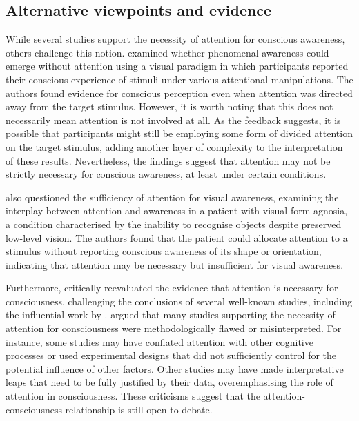 \documentclass[10pt]{article}
\begin{document}
\begin{sloppypar}
  \subsection{Alternative viewpoints and evidence}
  \label{sec:alternative}

  While several studies support the necessity of attention for conscious awareness, others challenge this notion. \cite{aru_phenomenal_2013} examined whether phenomenal awareness could emerge without attention using a visual paradigm in which participants reported their conscious experience of stimuli under various attentional manipulations. The authors found evidence for conscious perception even when attention was directed away from the target stimulus. However, it is worth noting that this does not necessarily mean attention is not involved at all. As the feedback suggests, it is possible that participants might still be employing some form of divided attention on the target stimulus, adding another layer of complexity to the interpretation of these results. Nevertheless, the findings suggest that attention may not be strictly necessary for conscious awareness, at least under certain conditions.

  \cite{kentridge_attended_2008} also questioned the sufficiency of attention for visual awareness, examining the interplay between attention and awareness in a patient with visual form agnosia, a condition characterised by the inability to recognise objects despite preserved low-level vision. The authors found that the patient could allocate attention to a stimulus without reporting conscious awareness of its shape or orientation, indicating that attention may be necessary but insufficient for visual awareness.

  Furthermore, \cite{kozuch_gorillas_2018} critically reevaluated the evidence that attention is necessary for consciousness, challenging the conclusions of several well-known studies, including the influential work by \cite{cohen_attentional_2012}. \citeauthor*{kozuch_gorillas_2018} argued that many studies supporting the necessity of attention for consciousness were methodologically flawed or misinterpreted. For instance, some studies may have conflated attention with other cognitive processes or used experimental designs that did not sufficiently control for the potential influence of other factors. Other studies may have made interpretative leaps that need to be fully justified by their data, overemphasising the role of attention in consciousness. These criticisms suggest that the attention-consciousness relationship is still open to debate.


\end{sloppypar}
\end{document}
